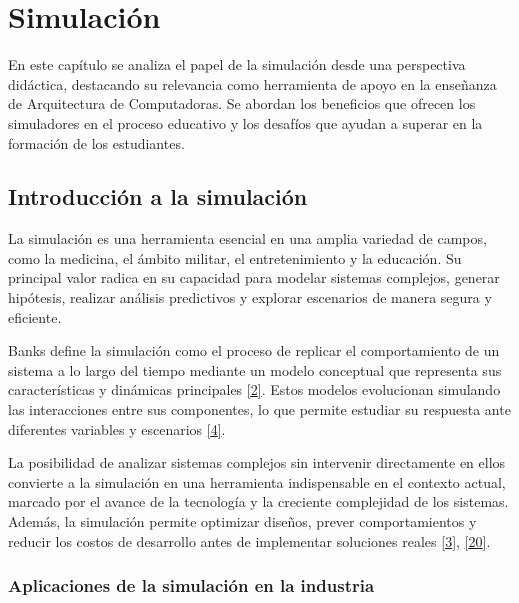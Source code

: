\documentclass[12pt,oneside]{templates/unerthesis}
\begin{document}
\hypertarget{simulaciuxf3n}{%
\chapter{Simulación}\label{simulaciuxf3n}}

En este capítulo se analiza el papel de la simulación desde una perspectiva didáctica, destacando su relevancia como herramienta de apoyo en la enseñanza de Arquitectura de Computadoras. Se abordan los beneficios que ofrecen los simuladores en el proceso educativo y los desafíos que ayudan a superar en la formación de los estudiantes.

\hypertarget{introducciuxf3n-a-la-simulaciuxf3n}{%
\section{Introducción a la simulación}\label{introducciuxf3n-a-la-simulaciuxf3n}}

La simulación es una herramienta esencial en una amplia variedad de campos, como la medicina, el ámbito militar, el entretenimiento y la educación. Su principal valor radica en su capacidad para modelar sistemas complejos, generar hipótesis, realizar análisis predictivos y explorar escenarios de manera segura y eficiente.

Banks define la simulación como el proceso de replicar el comportamiento de un sistema a lo largo del tiempo mediante un modelo conceptual que representa sus características y dinámicas principales \protect\hyperlink{ref-banks_discrete-event_2010}{{[}2{]}}. Estos modelos evolucionan simulando las interacciones entre sus componentes, lo que permite estudiar su respuesta ante diferentes variables y escenarios \protect\hyperlink{ref-robinson_simulation_2014}{{[}4{]}}.

La posibilidad de analizar sistemas complejos sin intervenir directamente en ellos convierte a la simulación en una herramienta indispensable en el contexto actual, marcado por el avance de la tecnología y la creciente complejidad de los sistemas. Además, la simulación permite optimizar diseños, prever comportamientos y reducir los costos de desarrollo antes de implementar soluciones reales \protect\hyperlink{ref-law_simulation_2015}{{[}3{]}}, \protect\hyperlink{ref-zeigler_theory_2000}{{[}20{]}}.

\hypertarget{aplicaciones-de-la-simulaciuxf3n-en-la-industria}{%
\subsection{Aplicaciones de la simulación en la industria}\label{aplicaciones-de-la-simulaciuxf3n-en-la-industria}}
\end{document}
